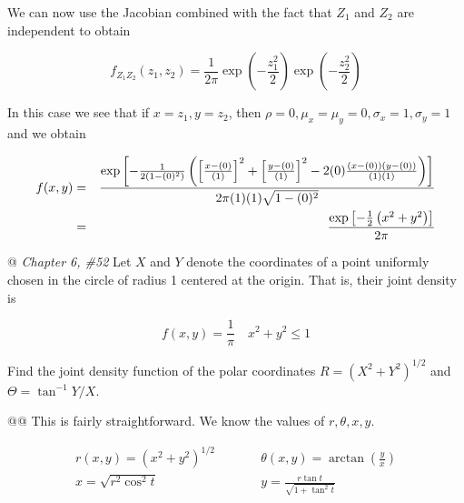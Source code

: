 \documentclass[11pt]{article}\usepackage[]{graphicx}\usepackage[]{xcolor}
\begin{document}
\begin{easylist}[enumerate]
    We can now use the Jacobian combined with the fact that $Z_1$ and $Z_2$ are independent to obtain

    \begin{equation}
        f_{Z_1Z_2}(z_1, z_2) =
            \frac{1}{2\pi} \exp\left({ -\frac{z_1^2}{2} }\right) \exp\left({ -\frac{z_2^2}{2} }\right)
    \end{equation}

    In this case we see that if $x=z_1, y=z_2$, then $\rho=0, \mu_x=\mu_y=0, \sigma_x=1, \sigma_y=1$ and we obtain

    \begin{equation}
        \begin{aligned}
            f(x, y) &=&
                \frac{%
                \exp \left[
                    - \frac{1}{2\left( 1 - (0)^2 \right)}
                    \left(
                        {\left[ \frac{x - (0)}{(1)} \right]}^2 +
                        {\left[ \frac{y - (0)}{(1)} \right]}^2 -
                        2 (0) \frac{(x - (0))(y - (0))}{(1)(1)}
                    \right)
                \right]}{2\pi (1) (1) \sqrt{1 - (0)^2} }\\
            &=& \frac{%
                \exp \left[
                    - \frac{1}{2}
                    \left(
                        x^2 + y^2
                    \right)
                \right]}{2\pi}
        \end{aligned}
    \end{equation}

    @ \textit{Chapter 6, \#52} Let $X$ and $Y$ denote the coordinates of a point uniformly chosen in the circle of
    radius 1 centered at the origin. That is, their joint density is

    \begin{equation}
        f(x, y) = \frac{1}{\pi} \quad x^2 + y^2 \le 1
    \end{equation}

    Find the joint density function of the polar coordinates $R = (X^2 + Y^2 )^{1/2}$ and $\Theta = \tan^{−1} Y/X$.

    @@ This is fairly straightforward. We know the values of $r, \theta, x, y$.

    \begin{equation}
        \begin{aligned}
            r(x, y) = {(x^2 + y^2)}^{1/2} &\qquad& \theta(x, y) = \arctan \left( \frac{y}{x} \right)\\
            x = \sqrt{r^2 \cos^2 t} &\qquad& y = \frac{r \tan t}{\sqrt{1 + \tan^2 t} }
        \end{aligned}
    \end{equation}


\end{easylist}
\end{document}
